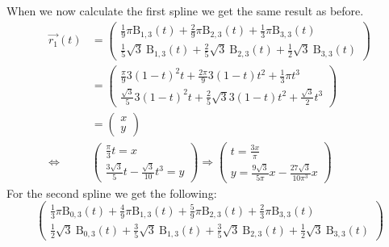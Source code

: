 When we now calculate the first spline we get the same result as before.
\begin{equation}
\begin{aligned}
\vec{r_1}(t)&=\left(\begin{array}{c}
\frac{1}{9} \pi \mathrm{B}_{1,3}(t)+\frac{2}{9} \pi \mathrm{B}_{2,3}(t)+\frac{1}{3} \pi \mathrm{B}_{3,3}(t) \\
\frac{1}{5} \sqrt{3} \mathrm{~B}_{1,3}(t)+\frac{2}{5} \sqrt{3} \mathrm{~B}_{2,3}(t)+\frac{1}{2} \sqrt{3} \mathrm{~B}_{3,3}(t)
\end{array}\right)\\
&=\left(\begin{array}{l}
\frac{\pi}{9} 3(1-t)^2 t+\frac{2 \pi}{9} 3(1-t) t^2+\frac{1}{3} \pi t^3 \\
\frac{\sqrt{3}}{5} 3(1-t)^2 t+\frac{2}{5} \sqrt{3} 3(1-t) t^2+\frac{\sqrt{3}}{2} t^3
\end{array}\right)\\
&=\left(\begin{array}{l}
x \\
y
\end{array}\right)\\
\Longleftrightarrow & \left(\begin{array}{c}
\frac{\pi}{3} t=x \\
\frac{3 \sqrt{3}}{5} t-\frac{\sqrt{3}}{10} t^3=y
\end{array}\right) \Rightarrow\left(\begin{array}{l}
t=\frac{3 x}{\pi} \\
y=\frac{9 \sqrt{3}}{5 \pi} x-\frac{27 \sqrt{3}}{10 \pi^3} x
\end{array}\right)
\end{aligned}
\end{equation}
For the second spline we get the following:
\begin{equation}
\left(\begin{array}{c}
\frac{1}{3} \pi \mathrm{B}_{0,3}(t)+\frac{4}{9} \pi \mathrm{B}_{1,3}(t)+\frac{5}{9} \pi \mathrm{B}_{2,3}(t)+\frac{2}{3} \pi \mathrm{B}_{3,3}(t) \\
\frac{1}{2} \sqrt{3} \mathrm{~B}_{0,3}(t)+\frac{3}{5} \sqrt{3} \mathrm{~B}_{1,3}(t)+\frac{3}{5} \sqrt{3} \mathrm{~B}_{2,3}(t)+\frac{1}{2} \sqrt{3} \mathrm{~B}_{3,3}(t)
\end{array}\right)
\end{equation}

